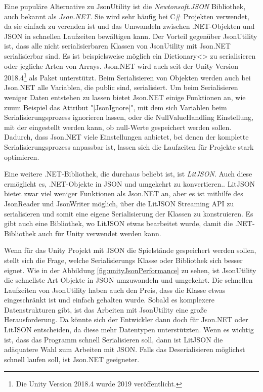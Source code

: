 Eine pupuläre Alternative zu JsonUtility ist die \textit{Newtonsoft.JSON} Bibliothek, auch bekannt als \textit{Json.NET}. Sie wird sehr häufig bei C\# Projekten verwendet, da sie einfach zu verenden ist und das Umwandeln zwischen .NET-Objekten und JSON in schnellen Laufzeiten bewältigen kann.\cite{newtonsoftJsonNETNewtonsoft} Der Vorteil gegenüber JsonUtility ist, dass alle nicht serialisierbaren Klassen von JsonUtility mit Json.NET serialisierbar sind. Es ist beispielsweise möglich ein Dictionary<> zu serialisieren\cite{newtonsoftSerializeDictionary}\cite{newtonsoftDeserializeDictionary} oder jegliche Arten von Arrays. Json.NET wird auch seit der Unity Version 2018.4\footnote{Die Unity Version 2018.4 wurde 2019 veröffentlicht.\cite{unityDownloadArchive}} als Paket unterstützt.\cite{NewtonsoftJsonUnitySupport} Beim Serialisieren von Objekten werden auch bei Json.NET alle Variablen, die public sind, serialisiert. Um beim Serialisieren weniger Daten entstehen zu lassen bietet Json.NET einige Funktionen an, wie zuum Beispiel das Attribut "[JsonIgnore]", mit dem sich Variablen beim Serialisierungsprozess ignorieren lassen, oder die NullValueHandling Einstellung, mit der eingestellt werden kann, ob null-Werte gespeichert werden sollen. Dadurch, dass Json.NET viele Einstellungen anbietet, bei denen der komplette Serialisierungsprozess anpassbar ist, lassen sich die Laufzeiten für Projekte stark optimieren.\cite{newtonsoftReducingSerialized}\cite{newtonsoftPerformanceTips}

Eine weitere .NET-Bibliothek, die durchaus beliebt ist, ist \textit{LitJSON}. Auch diese ermöglicht es, .NET-Objekte in JSON und umgekehrt zu konvertieren.\cite{litjsonLitJSONDocumentation}. LitJSON bietet zwar viel weniger Funktionen als Json.NET an, aber es ist mithilfe des JsonReader und JsonWriter möglich, über die LitJSON Streaming API zu serialisieren und somit eine eigene Serialisierung der Klassen zu konstruieren.\cite{litjsonLitJSONReaders} Es gibt auch eine Bibliothek, wo LitJSON etwas bearbeitet wurde, damit die .NET-Bibliothek auch für Unity verwendet werden kann.\cite{githubGitHubMervillUnityLitJson}

Wenn für das Unity Projekt mit JSON die Spielstände gespeichert werden sollen, stellt sich die Frage, welche Serialisierungs Klasse oder Bibliothek sich besser eignet. Wie in der Abbildung \ref{fig:unityJsonPerformance} zu sehen, ist JsonUtility die schnellste Art Objekte in JSON umzuwandeln und umgekehrt. Die schnellen Laufzeiten von JsonUtility haben auch den Preis, dass die Klasse etwas eingeschränkt ist und einfach gehalten wurde. Sobald es komplexere Datenstrukturen gibt, ist das Arbeiten mit JsonUtility eine große Herausforderung. Da könnte sich der Entwickler dann doch für Json.NET oder LitJSON entscheiden, da diese mehr Datentypen unterstützten. Wenn es wichtig ist, dass das Programm schnell Serialisieren soll, dann ist LitJSON die adäquatere Wahl zum Arbeiten mit JSON. Falls das Deserialisieren möglichst schnell laufen soll, ist Json.NET geeigneter.

